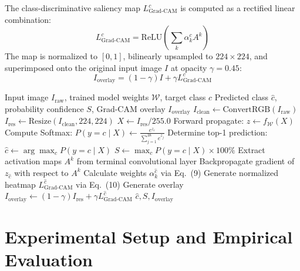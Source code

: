 \documentclass[journal]{IEEEtran}
\begin{document}
The class-discriminative saliency map $L_{\text{Grad-CAM}}^c$ is computed as a rectified linear combination:
\begin{equation}
L_{\text{Grad-CAM}}^c = \text{ReLU}\left( \sum_{k} \alpha_k^c A^k \right)
\end{equation}
The map is normalized to $[0, 1]$, bilinearly upsampled to $224 \times 224$, and superimposed onto the original input image $I$ at opacity $\gamma = 0.45$:
\begin{equation}
I_{\text{overlay}} = (1 - \gamma) I + \gamma L_{\text{Grad-CAM}}^c
\end{equation}

\begin{algorithm}[t]
\caption{AgroVision Classification and Visual Explainability Pipeline}
\label{alg:inference}
\begin{algorithmic}[1]
\REQUIRE Input image $I_{\text{raw}}$, trained model weights $\mathcal{W}$, target class $c$
\ENSURE Predicted class $\hat{c}$, probability confidence $S$, Grad-CAM overlay $I_{\text{overlay}}$
\STATE $I_{\text{clean}} \leftarrow \text{ConvertRGB}(I_{\text{raw}})$
\STATE $I_{\text{res}} \leftarrow \text{Resize}(I_{\text{clean}}, 224, 224)$
\STATE $X \leftarrow I_{\text{res}} / 255.0$
\STATE Forward propagate: $z \leftarrow f_{\mathcal{W}}(X)$
\STATE Compute Softmax: $P(y = c \mid X) \leftarrow \frac{e^{z_c}}{\sum_{j=1}^{38} e^{z_j}}$
\STATE Determine top-1 prediction: $\hat{c} \leftarrow \arg\max_c P(y = c \mid X)$
\STATE $S \leftarrow \max_c P(y = c \mid X) \times 100\%$
\STATE Extract activation maps $A^k$ from terminal convolutional layer
\STATE Backpropagate gradient of $z_{\hat{c}}$ with respect to $A^k$
\STATE Calculate weights $\alpha_k^{\hat{c}}$ via Eq.~(9)
\STATE Generate normalized heatmap $L_{\text{Grad-CAM}}^{\hat{c}}$ via Eq.~(10)
\STATE Generate overlay $I_{\text{overlay}} \leftarrow (1 - \gamma) I_{\text{res}} + \gamma L_{\text{Grad-CAM}}^{\hat{c}}$
\RETURN $\hat{c}, S, I_{\text{overlay}}$
\end{algorithmic}
\end{algorithm}

\section{Experimental Setup and Empirical Evaluation}
\end{document}
